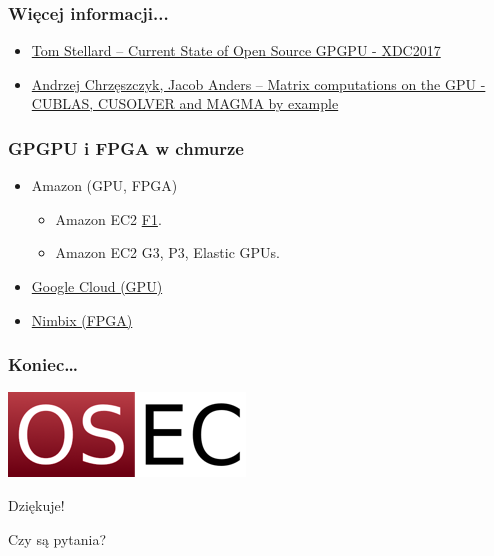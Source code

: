 \documentclass[dvipsnames,table]{beamer}
\begin{document}
\begin{frame}
\frametitle{Więcej informacji...}
\begin{itemize}
	\item \href{https://www.x.org/wiki/Events/XDC2017/Stellard_GPGPU.pdf}{Tom Stellard -- Current State of Open Source GPGPU - XDC2017}
	\item \href{https://developer.nvidia.com/sites/default/files/akamai/cuda/files/Misc/mygpu.pdf}{Andrzej Chrzęszczyk, Jacob Anders -- Matrix computations on the GPU - CUBLAS, CUSOLVER and MAGMA by example}

\end{itemize}
\end{frame}

\begin{frame}
	\frametitle{GPGPU i FPGA w chmurze}
\begin{itemize}
	\item Amazon (GPU, FPGA)
	\begin{itemize}
		\item Amazon EC2 \href{https://aws.amazon.com/ec2/instance-types/f1/}{F1}.
		\item Amazon EC2 G3, P3, Elastic GPUs.
	\end{itemize}
	\item \href{https://cloud.google.com/gpu/}{Google Cloud (GPU)}
	\item \href{https://www.nimbix.net/xilinx/}{Nimbix (FPGA)}
\end{itemize}
\end{frame}


\begin{frame}
\frametitle{Koniec\ldots}
\begin{center}
\includegraphics[scale=0.5]{img-oseclogo.png}

Dziękuje!

Czy są pytania?

\end{center}
\end{frame}
\end{document}
